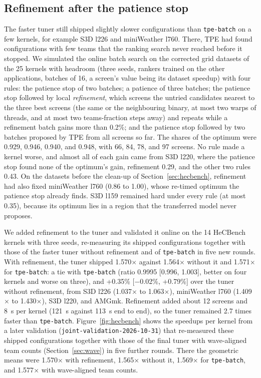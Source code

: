 \documentclass[10pt]{article}
\newcommand{\x}{\ensuremath{\times}}
\newcommand{\code}[1]{\texttt{#1}}
\begin{document}
\subsection{Refinement after the patience stop}
\label{sec:refine}
The faster tuner still shipped slightly slower configurations than
\code{tpe-batch} on a few kernels, for example S3D l226 and miniWeather l760.
There, TPE had found configurations with few teams that the ranking search
never reached before it stopped. We simulated the online batch search on the
corrected grid datasets of the 25 kernels with headroom (three seeds, rankers
trained on the other applications, batches of 16, a screen's value being its
dataset speedup) with four rules: the patience stop of two batches; a
patience of three batches; the patience stop followed by local
\emph{refinement}, which screens the untried candidates nearest to the three
best screens (the same or the neighbouring binary, at most two warps of
threads, and at most two teams-fraction steps away) and repeats while a
refinement batch gains more than 0.2\%; and the patience stop followed by two
batches proposed by TPE from all screens so far. The shares of the optimum
were 0.929, 0.946, 0.940, and 0.948, with 66, 84, 78, and 97 screens. No rule
made a kernel worse, and almost all of each gain came from S3D l220, where the
patience stop found none of the optimum's gain, refinement 0.29, and the other
two rules 0.43. On the datasets before the clean-up of
Section~\ref{sec:hecbench}, refinement had also fixed miniWeather l760 (0.86 to
1.00), whose re-timed optimum the patience stop already finds. S3D l159
remained hard under every rule (at most 0.35), because its optimum lies in a
region that the transferred model never proposes.

We added refinement to the tuner and validated it online on the 14 HeCBench
kernels with three seeds, re-measuring its shipped configurations together
with those of the faster tuner without refinement and of \code{tpe-batch} in
five new rounds. With refinement, the tuner shipped 1.570\x{} against 1.564\x{}
without it and 1.571\x{} for \code{tpe-batch}: a tie with \code{tpe-batch}
(ratio 0.9995 [0.996, 1.003], better on four kernels and worse on three), and
+0.35\% [$-$0.02\%, +0.79\%] over the tuner without refinement, from S3D l226
(1.037\x{} to 1.063\x{}), miniWeather l760 (1.409\x{} to 1.430\x{}), S3D l220, and
AMGmk. Refinement added about 12 screens and 8~s per kernel (121~s against
113~s end to end), so the tuner remained 2.7 times faster than
\code{tpe-batch}. Figure~\ref{fig:hecbench} shows the speedups per kernel from
a later validation (\code{joint-validation-2026-10-31}) that re-measured these
shipped configurations together with those of the final tuner with wave-aligned
team counts (Section~\ref{sec:wave}) in five further rounds. There the
geometric means were 1.570\x{} with refinement, 1.565\x{} without it,
1.569\x{} for \code{tpe-batch}, and 1.577\x{} with wave-aligned team counts.
\end{document}
